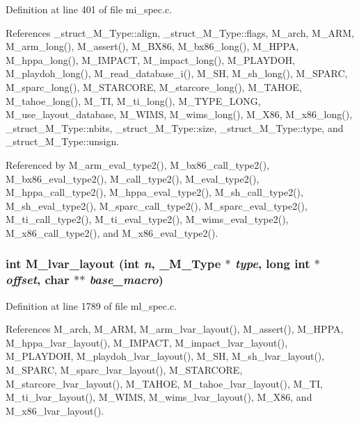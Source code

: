 Definition at line 401 of file mi\_\-spec.c.

References \_\-struct\_\-M\_\-Type::align, \_\-struct\_\-M\_\-Type::flags, M\_\-arch, M\_\-ARM, M\_\-arm\_\-long(), M\_\-assert(), M\_\-BX86, M\_\-bx86\_\-long(), M\_\-HPPA, M\_\-hppa\_\-long(), M\_\-IMPACT, M\_\-impact\_\-long(), M\_\-PLAYDOH, M\_\-playdoh\_\-long(), M\_\-read\_\-database\_\-i(), M\_\-SH, M\_\-sh\_\-long(), M\_\-SPARC, M\_\-sparc\_\-long(), M\_\-STARCORE, M\_\-starcore\_\-long(), M\_\-TAHOE, M\_\-tahoe\_\-long(), M\_\-TI, M\_\-ti\_\-long(), M\_\-TYPE\_\-LONG, M\_\-use\_\-layout\_\-database, M\_\-WIMS, M\_\-wims\_\-long(), M\_\-X86, M\_\-x86\_\-long(), \_\-struct\_\-M\_\-Type::nbits, \_\-struct\_\-M\_\-Type::size, \_\-struct\_\-M\_\-Type::type, and \_\-struct\_\-M\_\-Type::unsign.

Referenced by M\_\-arm\_\-eval\_\-type2(), M\_\-bx86\_\-call\_\-type2(), M\_\-bx86\_\-eval\_\-type2(), M\_\-call\_\-type2(), M\_\-eval\_\-type2(), M\_\-hppa\_\-call\_\-type2(), M\_\-hppa\_\-eval\_\-type2(), M\_\-sh\_\-call\_\-type2(), M\_\-sh\_\-eval\_\-type2(), M\_\-sparc\_\-call\_\-type2(), M\_\-sparc\_\-eval\_\-type2(), M\_\-ti\_\-call\_\-type2(), M\_\-ti\_\-eval\_\-type2(), M\_\-wims\_\-eval\_\-type2(), M\_\-x86\_\-call\_\-type2(), and M\_\-x86\_\-eval\_\-type2().
\subsubsection{\setlength{\rightskip}{0pt plus 5cm}int M\_\-lvar\_\-layout (int {\em n}, \bf{\_\-M\_\-Type} $\ast$ {\em type}, long int $\ast$ {\em offset}, char $\ast$$\ast$ {\em base\_\-macro})}\label{m__spec_8h_1bbc6c0d042d048a9e0eb1fa09d247d7}




Definition at line 1789 of file ml\_\-spec.c.

References M\_\-arch, M\_\-ARM, M\_\-arm\_\-lvar\_\-layout(), M\_\-assert(), M\_\-HPPA, M\_\-hppa\_\-lvar\_\-layout(), M\_\-IMPACT, M\_\-impact\_\-lvar\_\-layout(), M\_\-PLAYDOH, M\_\-playdoh\_\-lvar\_\-layout(), M\_\-SH, M\_\-sh\_\-lvar\_\-layout(), M\_\-SPARC, M\_\-sparc\_\-lvar\_\-layout(), M\_\-STARCORE, M\_\-starcore\_\-lvar\_\-layout(), M\_\-TAHOE, M\_\-tahoe\_\-lvar\_\-layout(), M\_\-TI, M\_\-ti\_\-lvar\_\-layout(), M\_\-WIMS, M\_\-wims\_\-lvar\_\-layout(), M\_\-X86, and M\_\-x86\_\-lvar\_\-layout().
